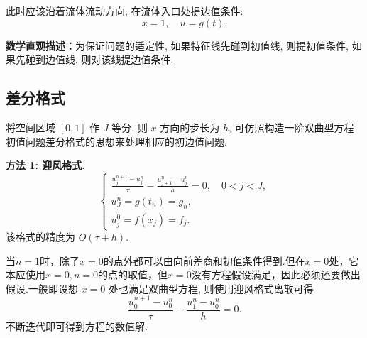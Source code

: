 此时应该沿着流体流动方向, 在流体入口处提边值条件:
\begin{equation*}
    x = 1, \quad u = g(t).
\end{equation*}

\textbf{数学直观描述：}为保证问题的适定性, 如果特征线先碰到初值线, 则提初值条件, 如果先碰到边值线, 则对该线提边值条件.

\subsection{差分格式}

将空间区域 $[0,1]$ 作 $J$ 等分, 则 $x$ 方向的步长为 $h$, 可仿照构造一阶双曲型方程初值问题差分格式的思想来处理相应的初边值问题.

\noindent\textbf{方法 1: 迎风格式.}
\begin{equation*}
    \begin{cases}
        \frac{u_j^{n+1} - u_j^n}{\tau} - \frac{u_{j+1}^n - u_j^n}{h} = 0, \quad 0 < j < J, \\
        u_J^n = g(t_n) = g_n, \\
        u_j^0 = f(x_j) = f_j.
    \end{cases}
\end{equation*}
该格式的精度为 $O(\tau + h)$.\par
当$n=1$时，除了$x=0$的点外都可以由向前差商和初值条件得到.但在$x=0$处，它本应使用$x=0,n=0$的点的取值，但$x=0$没有方程假设满足，因此必须还要做出假设.一般即设想 $x = 0$ 处也满足双曲型方程, 则使用迎风格式离散可得
\begin{equation*}
    \frac{u_0^{n+1} - u_0^n}{\tau} - \frac{u_1^n - u_0^n}{h} = 0.
\end{equation*}
不断迭代即可得到方程的数值解.\par

